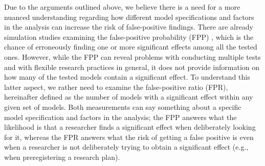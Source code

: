 Due to the arguments outlined above, we believe there is a need for a more nuanced understanding regarding how different model specifications and factors in the analysis can increase the risk of false-positive findings. There are already simulation studies examining the false-positive probability (FPP) \citep{Simmons2011}, which is the chance of erroneously finding one or more significant effects among all the tested ones. However, while the FPP can reveal problems with conducting multiple tests and with flexible research practices in general, it does not provide information on how many of the tested models contain a significant effect. To understand this latter aspect, we rather need to examine the false-positive ratio (FPR), hereinafter defined as the number of models with a significant effect within any given set of models. Both measurements can say something about a specific model specification and factors in the analysis; the FPP answers what the likelihood is that a researcher finds a significant effect when deliberately looking for it, whereas the FPR answers what the risk of getting a false positive is even when a researcher is not deliberately trying to obtain a significant effect (e.g., when preregistering a research plan). \\

